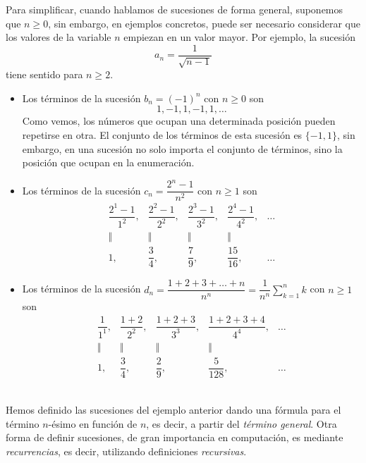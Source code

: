 Para simplificar, cuando hablamos de sucesiones de forma general, suponemos que $n\ge0$, sin embargo, en ejemplos concretos, puede ser necesario considerar que los valores de la variable $n$ empiezan en un valor mayor.
Por ejemplo, la sucesión
\[
a_n=\dfrac1{\sqrt{n-1}}
\]
tiene sentido para $n\ge 2$.
%
\begin{ejemplo-br}
\label{61suc}
\begin{itemize}
\item 
Los términos de la sucesión $b_n=(-1)^n$ con $n\ge 0$ son 
\[
1,-1,1,-1,1,\dots
\]
Como vemos, los números que ocupan una determinada posición pueden repetirse en otra.
El conjunto de los términos de esta sucesión es $\{-1,1\}$, sin embargo, en una sucesión no solo importa el conjunto de términos, sino la posición que ocupan en la enumeración.
\item 
Los términos de la sucesión $c_n=\dfrac{2^n-1}{n^2}$ con $n\ge 1$ son
\newcommand{\veq}{\rule[-.3em]{.5pt}{.8em}\kern.17em\rule[-.3em]{.5pt}{.8em}}
\[
\begin{array}{ccccc}
\dfrac{2^1-1}{1^2},&\dfrac{2^2-1}{2^2},&\dfrac{2^3-1}{3^2},&\dfrac{2^4-1}{4^2},&\dots\\
\Vert & \Vert & \Vert & \Vert & \\
1,&\dfrac34,&\dfrac79,&\dfrac{15}{16},&\dots
\end{array}
\]
\item
Los términos de la sucesión
$\mathit{d}_n=\dfrac{1+2+3+\dots+n}{n^n}=
\displaystyle\dfrac{1}{n^n}\sum_{k=1}^n k$ con $n\ge 1$ son
\[
\begin{array}{ccccc}
\dfrac{1}{1^1},&\dfrac{1+2}{2^2},&\dfrac{1+2+3}{3^3},&\dfrac{1+2+3+4}{4^4},&\dots\\
\Vert & \Vert & \Vert & \Vert & \\
1,&\dfrac{3}{4},&\dfrac{2}{9},&\dfrac{5}{128},&\dots 
\end{array}
\]
\ \fej
\end{itemize}
\end{ejemplo-br}

Hemos definido las sucesiones del ejemplo anterior dando una fórmula para el término $n$-ésimo en función de $n$, es decir, a partir del \emph{término general}.
Otra forma de definir sucesiones, de gran importancia en computación, es mediante \emph{recurrencias}, es decir, utilizando definiciones \emph{recursivas}.

